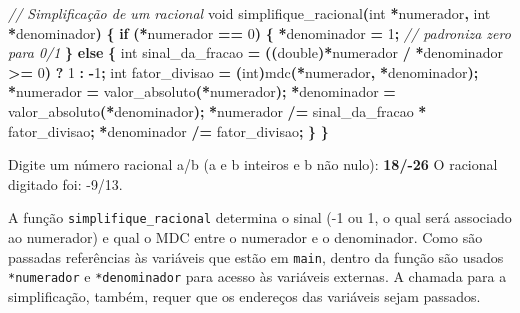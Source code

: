 \documentclass[
  11pt,
  a4paper,
]{scrbook}
\newenvironment{Shaded}{\begin{snugshade}}{\end{snugshade}}
\newcommand{\CommentTok}[1]{\textcolor[rgb]{0.56,0.35,0.01}{\textit{#1}}}
\newcommand{\ControlFlowTok}[1]{\textcolor[rgb]{0.13,0.29,0.53}{\textbf{#1}}}
\newcommand{\DataTypeTok}[1]{\textcolor[rgb]{0.13,0.29,0.53}{#1}}
\newcommand{\DecValTok}[1]{\textcolor[rgb]{0.00,0.00,0.81}{#1}}
\newcommand{\KeywordTok}[1]{\textcolor[rgb]{0.13,0.29,0.53}{\textbf{#1}}}
\newcommand{\NormalTok}[1]{#1}
\newcommand{\OperatorTok}[1]{\textcolor[rgb]{0.81,0.36,0.00}{\textbf{#1}}}
\begin{document}
\begin{Shaded}
\begin{Highlighting}[]
\CommentTok{// Simplificação de um racional}
\DataTypeTok{void}\NormalTok{ simplifique\_racional}\OperatorTok{(}\DataTypeTok{int} \OperatorTok{*}\NormalTok{numerador}\OperatorTok{,} \DataTypeTok{int} \OperatorTok{*}\NormalTok{denominador}\OperatorTok{)} \OperatorTok{\{}
    \ControlFlowTok{if} \OperatorTok{(*}\NormalTok{numerador }\OperatorTok{==} \DecValTok{0}\OperatorTok{)} \OperatorTok{\{}
        \OperatorTok{*}\NormalTok{denominador }\OperatorTok{=} \DecValTok{1}\OperatorTok{;}  \CommentTok{// padroniza zero para 0/1}
    \OperatorTok{\}}
    \ControlFlowTok{else} \OperatorTok{\{}
        \DataTypeTok{int}\NormalTok{ sinal\_da\_fracao }\OperatorTok{=} \OperatorTok{((}\DataTypeTok{double}\OperatorTok{)*}\NormalTok{numerador }\OperatorTok{/} \OperatorTok{*}\NormalTok{denominador }\OperatorTok{\textgreater{}=} \DecValTok{0}\OperatorTok{)} \OperatorTok{?} \DecValTok{1} \OperatorTok{:} \OperatorTok{{-}}\DecValTok{1}\OperatorTok{;}
        \DataTypeTok{int}\NormalTok{ fator\_divisao }\OperatorTok{=} \OperatorTok{(}\DataTypeTok{int}\OperatorTok{)}\NormalTok{mdc}\OperatorTok{(*}\NormalTok{numerador}\OperatorTok{,} \OperatorTok{*}\NormalTok{denominador}\OperatorTok{);}
        \OperatorTok{*}\NormalTok{numerador }\OperatorTok{=}\NormalTok{ valor\_absoluto}\OperatorTok{(*}\NormalTok{numerador}\OperatorTok{);}
        \OperatorTok{*}\NormalTok{denominador }\OperatorTok{=}\NormalTok{ valor\_absoluto}\OperatorTok{(*}\NormalTok{denominador}\OperatorTok{);}
        \OperatorTok{*}\NormalTok{numerador }\OperatorTok{/=}\NormalTok{ sinal\_da\_fracao }\OperatorTok{*}\NormalTok{ fator\_divisao}\OperatorTok{;}
        \OperatorTok{*}\NormalTok{denominador }\OperatorTok{/=}\NormalTok{ fator\_divisao}\OperatorTok{;}
    \OperatorTok{\}}
\OperatorTok{\}}
\end{Highlighting}
\end{Shaded}

\begin{Shaded}
\begin{Highlighting}[]
\NormalTok{Digite um número racional a/b (a e b inteiros e b não nulo): }\KeywordTok{ 18/{-}26 }
\NormalTok{O racional digitado foi: {-}9/13.}
\end{Highlighting}
\end{Shaded}

A função \texttt{simplifique\_racional} determina o sinal (-1 ou 1, o
qual será associado ao numerador) e qual o MDC entre o numerador e o
denominador. Como são passadas referências às variáveis que estão em
\texttt{main}, dentro da função são usados \texttt{*numerador} e
\texttt{*denominador} para acesso às variáveis externas. A chamada para
a simplificação, também, requer que os endereços das variáveis sejam
passados.
\end{document}
